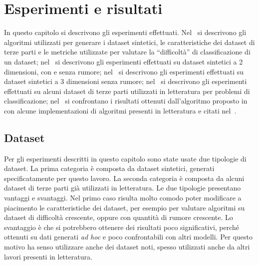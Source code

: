 \chapter{Esperimenti e risultati}
\label{chap:esperimenti}
In questo capitolo si descrivono gli esperimenti effettuati.
Nel~ si descrivono gli algoritmi utilizzati per generare i dataset sintetici, le caratteristiche dei dataset di terze parti e le metriche utilizzate per valutare la ``difficoltà'' di classificazione di un dataset;
nel~ si descrivono gli esperimenti effettuati su dataset sintetici a 2 dimensioni, con e senza rumore;
nel~ si descrivono gli esperimenti effettuati su dataset sintetici a 3 dimensioni senza rumore;
nel~ si descrivono gli esperimenti effettuati su alcuni dataset di terze parti utilizzati in letteratura per problemi di classificazione;
nel~ si confrontano i risultati ottenuti dall'algoritmo proposto in~ con alcune implementazioni di algoritmi presenti in letteratura e citati nel~.

\section{Dataset}\label{sec:exp:dataset}
Per gli esperimenti descritti in questo capitolo sono state usate due tipologie di dataset. 
La prima categoria è composta da dataset sintetici, generati specificatamente per questo lavoro. 
La seconda categoria è composta da alcuni dataset di terze parti già utilizzati in letteratura. 
Le due tipologie presentano vantaggi e svantaggi. Nel primo caso risulta molto comodo poter modificare a piacimento le caratteristiche dei dataset, per esempio per valutare algoritmi su dataset di difficoltà crescente, oppure con quantità di rumore crescente.
Lo svantaggio è che si potrebbero ottenere dei risultati poco significativi, perché ottenuti su dati generati \emph{ad hoc} e poco confrontabili con altri modelli. 
Per questo motivo ha senso utilizzare anche dei dataset noti, spesso utilizzati anche da altri lavori presenti in letteratura.

